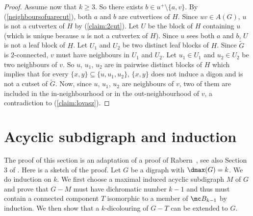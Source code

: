 \begin{proof}
Assume now that $k \geq 3$. So there exists $b \in u^+ \setminus \{a,v\}$. By (\ref{neighboursofuarecut}), both $a$ and $b$ are cutvertices of $H$. Since $uv \in A(G)$,  $u$ is not a cutvertex of $H$ by (\ref{claim:2cut}). 
Let $U$ be the block of $H$ containing $u$ (which is unique because $u$ is not a cutvertex of $H$). Since $u$ sees both $a$ and $b$, $U$ is not a leaf block of $H$. 
Let $U_{1}$ and $U_{2}$ be two distinct leaf blocks of $H$. Since $\tilde{G}$ is $2$-connected, $v$ must have neighbours in $U_1$ and $U_2$. Let $u_1 \in U_1$ and $u_2 \in U_2$ be two neighbours of $v$. 
So $u$, $u_1$, $u_2$ are in pairwise distinct blocks of $H$ which implies that for every $\{x,y\} \subseteq \{u,u_1,u_2\}$, $\{x,y\}$ does not induce a digon and is not a cutset of $\tilde{G}$. 
Now, since $u$, $u_1$, $u_2$ are neighbours of $v$, two of them are included in the in-neighbourhood or in the out-neighbourhood of $v$, a contradiction to (\ref{claim:lovasz}).
\end{proof}


\section{Acyclic subdigraph and induction}

The proof of this section is an adaptation of a proof of Rabern~\cite{R14}, see also Section 3 of \cite{CR14}. 
Here is a sketch of the proof. 
Let $G$ be a digraph with $\dmax(G) = k$. We do induction on $k$. 
We first choose a maximal induced acyclic subdigraph $M$ of $G$ and prove that $G-M$ must have dichromatic number $k-1$ and thus must contain a connected component $T$ isomorphic to a member of $\mc B_{k-1}$ by induction. We then show that a $k$-dicolouring of $G-T$ can be extended to $G$.  



